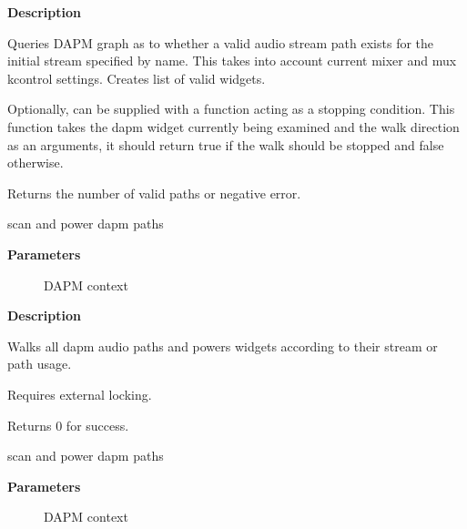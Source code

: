 \documentclass[a4paper,8pt,english]{sphinxmanual}
\begin{document}
\textbf{Description}

Queries DAPM graph as to whether a valid audio stream path exists for
the initial stream specified by name. This takes into account
current mixer and mux kcontrol settings. Creates list of valid widgets.

Optionally, can be supplied with a function acting as a stopping condition.
This function takes the dapm widget currently being examined and the walk
direction as an arguments, it should return true if the walk should be
stopped and false otherwise.

Returns the number of valid paths or negative error.

\begin{fulllineitems}
\label{sound/kernel-api/alsa-driver-api:c.snd_soc_dapm_sync_unlocked}
scan and power dapm paths

\end{fulllineitems}


\textbf{Parameters}
\begin{description}
\item[{}] \leavevmode
DAPM context

\end{description}

\textbf{Description}

Walks all dapm audio paths and powers widgets according to their
stream or path usage.

Requires external locking.

Returns 0 for success.

\begin{fulllineitems}
\label{sound/kernel-api/alsa-driver-api:c.snd_soc_dapm_sync}
scan and power dapm paths

\end{fulllineitems}


\textbf{Parameters}
\begin{description}
\item[{}] \leavevmode
DAPM context

\end{description}
\end{document}
